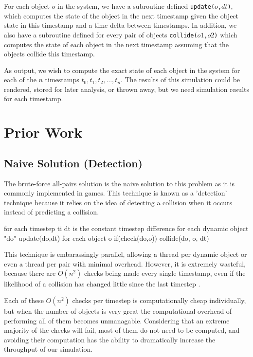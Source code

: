 \documentclass{article}
\begin{document}
For each object $o$ in the system, we have a subroutine defined \texttt{update($o$,$dt$)}, which computes the state of the object in the next timestamp given the object state in this timestamp and a time delta between timestamps.  In addition, we also have a subroutine defined for every pair of objects \texttt{collide($o1$,$o2$)} which computes the state of each object in the next timestamp assuming that the objects collide this timestamp.

As output, we wish to compute the exact state of each object in the system for each of the $n$ timestamps $t_0, t_1, t_2, \ldots, t_n$.  The results of this simulation could be rendered, stored for later analysis, or thrown away, but we need simulation results for each timestamp.
\section*{Prior Work}
\subsection*{Naive Solution (Detection)}
The brute-force all-pairs solution is the naive solution to this problem as it is commonly implemented in games.   This technique 
is known as a 'detection' technique because it relies on the idea of detecting a collision when it occurs instead of predicting a collision.  

\begin{verbatimtab}[4]
for each timestep ti
	dt is the constant timestep difference
	for each dynamic object "do"
		update(do,dt)		
		for each object  o
			if(check(do,o))
				collide(do, o, dt)
\end{verbatimtab}

This technique is embarassingly parallel, allowing a thread per dynamic object or even a thread per pair with minimal overhead.  However, it is extremely
wasteful, because there are $O(n^2)$ checks being made every single timestamp, even if the likelihood of a collision has changed little since the last timestep \cite{Seningood}.  

Each of these $O(n^2)$ checks per timestep is computationally cheap individually, but when the number of objects is very great the computational overhead of performing all of them becomes
unmanagable. Considering that an extreme majority of the checks will fail, most of them do not need to be computed, and avoiding their computation has the ability to dramatically increase the 
throughput of our simulation. 
\end{document}
